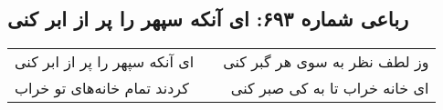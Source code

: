 \begin{center}
\section*{رباعی شماره ۶۹۳: ای آنکه سپهر را پر از ابر کنی}
\label{sec:sh693}
\begin{longtable}{l p{0.5cm} r}
ای آنکه سپهر را پر از ابر کنی
&&
وز لطف نظر به سوی هر گبر کنی
\\
کردند تمام خانه‌های تو خراب
&&
ای خانه خراب تا به کی صبر کنی
\\
\end{longtable}
\end{center}
